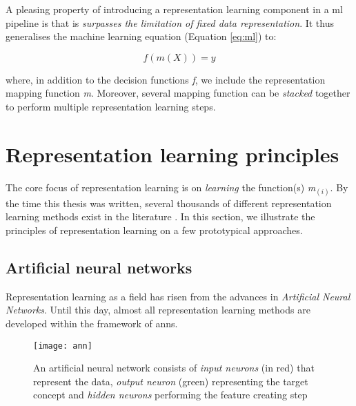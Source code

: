 A pleasing property of introducing a representation learning component in a \gls{ml} pipeline is that is \textit{surpasses the limitation of fixed data representation}.
It thus generalises the machine learning equation (Equation \ref{eq:ml}) to:

\begin{equation}
	f(m(X)) = y
\end{equation}


where, in addition to the decision functions \textit{f}, we include the representation mapping function \textit{m}.
Moreover, several mapping function can be \textit{stacked} together to perform multiple representation learning steps.







\section{Representation learning principles}


The core focus of representation learning is on \textit{learning} the function(s) \textit{m}$_{(i)}$.
By the time this thesis was written, several thousands of different representation learning methods exist in the literature \cite{Goodfellow2016}.
In this section, we illustrate the principles of representation learning on a few prototypical approaches.


\subsection{Artificial neural networks}



Representation learning as a field has risen from the advances in \textit{Artificial Neural Networks}.
Until this day, almost all representation learning methods are developed within the framework of \gls{ann}s.

\begin{figure}
	\centering
	\texttt{[image: ann]}
	\caption[Illustration of an artificial neural networks]{An artificial neural network consists of \textit{input neurons} (in red) that represent the data, \textit{output neuron} (green) representing the target concept and \textit{hidden neurons} performing the feature creating step}
	\label{fig:ann}
\end{figure}


